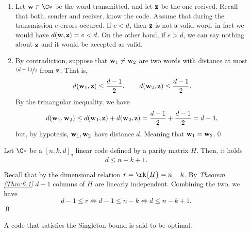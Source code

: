 \documentclass{subfiles}
\begin{document}
    \begin{proof*}
        \begin{enumerate}
            \item Let \(\bv{w} \in \C*\) be the word transmitted,
                and let \(\mathbf{z}\) be the one recived. Recall that both,
                sender and reciver, know the code. Assume that during the transmission 
                \(e\) errors occured. If \(e < d\), then \(\mathbf{z}\)
                is not a valid word, in fact we would have \(d(\mathbf{w}, \mathbf{z}) = e < d\). 
                On the other hand, if \(e > d\), we can say nothing about \(\mathbf{z}\)
                and it would be accepted as valid.

            \item By contradiction, suppose that \(\mathbf{w}_{1} \ne \mathbf{w}_{2}\) are 
                two words with distance at most \(\sfrac{(d - 1)}{2}\) from \(\mathbf{z}\).
                That is, 
                \[
                    d(\mathbf{w}_{1}, \mathbf{z}) \le \frac{d - 1}{2}, 
                        \qquad d(\mathbf{w}_{2}, \mathbf{z}) \le \frac{d - 1}{2}.
                \]
                By the trinangular inequality, we have 
                \[
                    d(\mathbf{w}_{1}, \mathbf{w}_{2}) \le 
                        d(\mathbf{w}_{1}, \mathbf{z}) + d(\mathbf{w}_{2}, \mathbf{z})
                        = \frac{d - 1}{2} + \frac{d - 1}{2} = d - 1,
                \]
                but, by hypotesis, \(\mathbf{w}_{1}, \mathbf{w}_{2}\) have distance \(d\).
                Meaning that \(\mathbf{w}_{1} = \mathbf{w}_{2}\).\qed
        \end{enumerate}
    \end{proof*}

    \begin{theorem}
        Let \(\C*\) be a \([n, k, d]_{q}\) linear code defined by a parity matrix \(H\). 
            Then, it holds 
            \[
                d \le n - k + 1.
            \]
    \end{theorem}

    \begin{proof*}
        Recall that by the dimensional relation \(r = \rk{H} = n - k\). By 
            \emph{Theorem \ref{Thm:6.1}} \(d - 1\) columns of \(H\) are linearly independent.
            Combining the two, we have 
            \[
                d - 1 \le r \iff d - 1 \le n - k \iff d \le n - k + 1.
            \]\qed
    \end{proof*}

    A code that satisfies the Singleton bound is said to be optimal.
\end{document}
